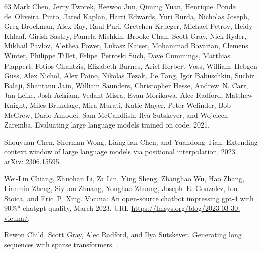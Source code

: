 \documentclass{article} \usepackage{iclr2024_conference,times}
\begin{document}
\begin{thebibliography}{63}
Mark Chen, Jerry Tworek, Heewoo Jun, Qiming Yuan, Henrique~Ponde
  de~Oliveira~Pinto, Jared Kaplan, Harri Edwards, Yuri Burda, Nicholas Joseph,
  Greg Brockman, Alex Ray, Raul Puri, Gretchen Krueger, Michael Petrov, Heidy
  Khlaaf, Girish Sastry, Pamela Mishkin, Brooke Chan, Scott Gray, Nick Ryder,
  Mikhail Pavlov, Alethea Power, Lukasz Kaiser, Mohammad Bavarian, Clemens
  Winter, Philippe Tillet, Felipe~Petroski Such, Dave Cummings, Matthias
  Plappert, Fotios Chantzis, Elizabeth Barnes, Ariel Herbert-Voss,
  William~Hebgen Guss, Alex Nichol, Alex Paino, Nikolas Tezak, Jie Tang, Igor
  Babuschkin, Suchir Balaji, Shantanu Jain, William Saunders, Christopher
  Hesse, Andrew~N. Carr, Jan Leike, Josh Achiam, Vedant Misra, Evan Morikawa,
  Alec Radford, Matthew Knight, Miles Brundage, Mira Murati, Katie Mayer, Peter
  Welinder, Bob McGrew, Dario Amodei, Sam McCandlish, Ilya Sutskever, and
  Wojciech Zaremba.
\newblock Evaluating large language models trained on code, 2021.

Shouyuan Chen, Sherman Wong, Liangjian Chen, and Yuandong Tian.
\newblock Extending context window of large language models via positional
  interpolation, 2023.
\newblock arXiv: 2306.15595.

Wei-Lin Chiang, Zhuohan Li, Zi~Lin, Ying Sheng, Zhanghao Wu, Hao Zhang, Lianmin
  Zheng, Siyuan Zhuang, Yonghao Zhuang, Joseph~E. Gonzalez, Ion Stoica, and
  Eric~P. Xing.
\newblock Vicuna: An open-source chatbot impressing gpt-4 with 90\%* chatgpt
  quality, March 2023.
\newblock URL \url{https://lmsys.org/blog/2023-03-30-vicuna/}.

Rewon Child, Scott Gray, Alec Radford, and Ilya Sutskever.
\newblock Generating long sequences with sparse transformers.
.


\end{thebibliography}
\end{document}
